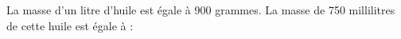 
La masse d'un litre d'huile est égale à 900 grammes. La masse de 750 millilitres de cette huile est égale à :

\smallskip

